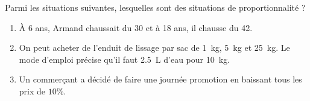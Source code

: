 
\begin{exercice}\label{exo2smath-0158}

    Parmi les situations suivantes, lesquelles sont des situations de proportionnalité ?

    \begin{enumerate}
        \item
 À 6 ans, Armand chaussait du 30 et à 18 ans, il chausse du 42.
\item
    On peut acheter de l'enduit de lissage par sac de \SI{1}{\kilo\gram}, \SI{5}{\kilo\gram} et \SI{25}{\kilo\gram}. Le mode d’emploi précise qu'il faut \SI{2.5}{\liter} d’eau pour \SI{10}{\kilo\gram}.
\item
 Un commerçant a décidé de faire une journée promotion en baissant tous les prix de $10$\%.

    \end{enumerate}
\end{exercice}
